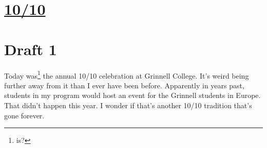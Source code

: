 \documentclass[12pt]{article}[titlepage]
\newcommand{\1}{\={a}}
\newcommand{\2}{\={e}}
\newcommand{\3}{\={\i}}
\newcommand{\4}{\=o}
\newcommand{\5}{\=u}
\newcommand{\6}{\={A}}
\renewcommand{\,}{\textsuperscript{,}}
\begin{document}
\doublespacing
\section{\href{ten.html}{10/10}}
\section{Draft 1}
Today was\footnote{is?} the annual 10/10 celebration at Grinnell College. It's weird being further away from it than I ever have been before. Apparently in years past, students in my program would host an event for the Grinnell students in Europe. That didn't happen this year. I wonder if that's another 10/10 tradition that's gone forever.
\end{document}
